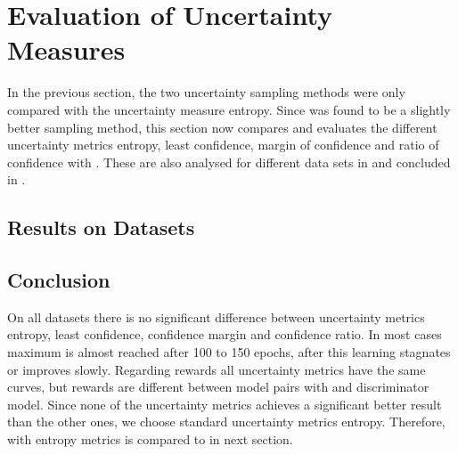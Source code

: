 \section{Evaluation of Uncertainty Measures}
\label{ch:evaluation:sec:evaluation_metrics}
%
In the previous section, the two uncertainty sampling methods were only compared with the uncertainty measure entropy.
Since \ussoftmax was found to be a slightly better sampling method, this section now compares and evaluates the different uncertainty metrics entropy, least confidence, margin of confidence and ratio of confidence with \ussoftmax. 
These are also analysed for different data sets in  and concluded in .
%
\subsection{Results on Datasets} \label{subsec:measures_results}





%
\subsection{Conclusion}
\label{subsec:measure_conclusion}
On all datasets there is no significant difference between uncertainty metrics entropy, least confidence, confidence margin and confidence ratio.
In most cases maximum is almost reached after 100 to 150 epochs, after this learning stagnates or improves slowly.
Regarding rewards all uncertainty metrics have the same curves, but rewards are different between model pairs with \transe and \transe discriminator model.
Since none of the uncertainty metrics achieves a significant better result than the other ones, we choose standard uncertainty metrics entropy.
Therefore, \ussoft with entropy metrics is compared to \origsampling in next section.